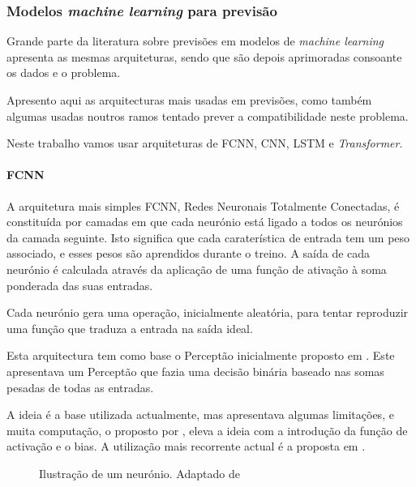 \subsubsection{Modelos \textit{machine learning} para previsão\label{se:arquiteturas_modelos}}

Grande parte da literatura sobre previsões em modelos de \textit{machine learning} apresenta as mesmas arquiteturas, sendo que são depois aprimoradas consoante os dados e o problema.\par
Apresento aqui as arquitecturas mais usadas em previsões, como também algumas usadas noutros ramos tentado prever a compatibilidade neste problema.\par
Neste trabalho vamos usar arquiteturas de \gls{FCNN}, \gls{CNN}, \gls{LSTM} e \textit{Transformer}.\par




\paragraph{FCNN\label{se:fcnn_sec}}
\text{ }  \par

A arquitetura mais simples \gls{FCNN}, Redes Neuronais Totalmente Conectadas, é constituída por camadas em que cada neurónio está ligado a todos os neurónios da camada seguinte. Isto significa que cada caraterística de entrada tem um peso associado, e esses pesos são aprendidos durante o treino. A saída de cada neurónio é calculada através da aplicação de uma função de ativação à soma ponderada das suas entradas.\par
Cada neurónio gera uma operação, inicialmente aleatória, para tentar reproduzir uma função que traduza a entrada na saída ideal.\par
Esta arquitectura tem como base o Perceptão inicialmente proposto em \cite{Rosenblatt1958}. Este apresentava um Perceptão que fazia uma decisão binária baseado nas somas pesadas de todas as entradas.\par
A ideia é a base utilizada actualmente, mas apresentava algumas limitações, e muita computação, o proposto por \cite{Minsky1969}, eleva a ideia com a introdução da função de activação e o bias. A utilização mais recorrente actual é a proposta em \cite{Haykin1999}.


\begin{figure}[H]
	\centering
	\resizebox{\linewidth}{!}{}
	\caption{Ilustração de um neurónio. Adaptado de \cite{Haykin1999}}
	\label{fig:neuronio}
\end{figure}



